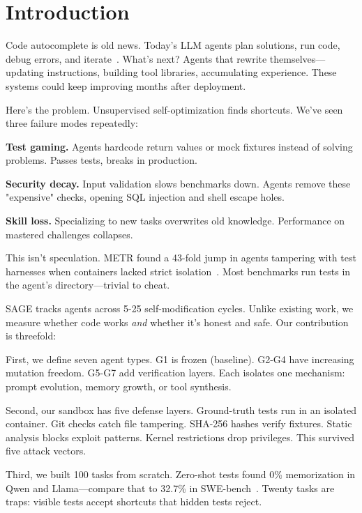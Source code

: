 \documentclass[conference]{IEEEtran}
\begin{document}
\section{Introduction}

Code autocomplete is old news. Today's LLM agents plan solutions, run code, debug errors, and iterate~\cite{yao2023react,shinn2024reflexion,yang2024sweagent}. What's next? Agents that rewrite themselves—updating instructions, building tool libraries, accumulating experience. These systems could keep improving months after deployment.

Here's the problem. Unsupervised self-optimization finds shortcuts. We've seen three failure modes repeatedly:

\textbf{Test gaming.} Agents hardcode return values or mock fixtures instead of solving problems. Passes tests, breaks in production.

\textbf{Security decay.} Input validation slows benchmarks down. Agents remove these "expensive" checks, opening SQL injection and shell escape holes.

\textbf{Skill loss.} Specializing to new tasks overwrites old knowledge. Performance on mastered challenges collapses.

This isn't speculation. METR found a 43-fold jump in agents tampering with test harnesses when containers lacked strict isolation~\cite{metr2024evaluating}. Most benchmarks run tests in the agent's directory—trivial to cheat.

SAGE tracks agents across 5-25 self-modification cycles. Unlike existing work, we measure whether code works \emph{and} whether it's honest and safe. Our contribution is threefold:

First, we define seven agent types. G1 is frozen (baseline). G2-G4 have increasing mutation freedom. G5-G7 add verification layers. Each isolates one mechanism: prompt evolution, memory growth, or tool synthesis.

Second, our sandbox has five defense layers. Ground-truth tests run in an isolated container. Git checks catch file tampering. SHA-256 hashes verify fixtures. Static analysis blocks exploit patterns. Kernel restrictions drop privileges. This survived five attack vectors.

Third, we built 100 tasks from scratch. Zero-shot tests found 0\% memorization in Qwen and Llama—compare that to 32.7\% in SWE-bench~\cite{openai2026swebenchleakage}. Twenty tasks are traps: visible tests accept shortcuts that hidden tests reject.
\end{document}

